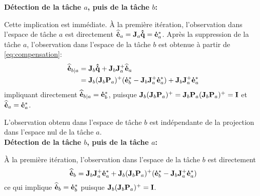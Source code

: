 \noindent\textbf{Détection de la t\^ache $a$, puis de la t\^ache $b$:}

  Cette implication est immédiate.
\`A la première itération, l'observation dans l'espace de t\^ache $a$ est directement
${\mathbf{\widehat{\dot{e}}}}_{a} = {\mathbf{J}}_a{\mathbf{\hat{\dot{q}}}} = {\mathbf{\dot{e}}}_{a}^*$.  
Après la suppression de la t\^ache $a$, l'observation dans l'espace de la t\^ache $b$
est obtenue à partir de \eqref{eq:compensation}:
\begin{align*}
 {\mathbf{\widehat{\dot{e}}}}_{b|a} &=  {\mathbf{J}}_b{\mathbf{\hat{\dot{q}}}} +  {\mathbf{J}}_b {\mathbf{J}}_a^+ {\mathbf{\widehat{\dot{e}}}}_{a}\\
 &= {\mathbf{J}}_b({\mathbf{J}}_b {\mathbf{P}}_a)^+ ({\mathbf{\dot{e}}}_{b}^* - {\mathbf{J}}_b {\mathbf{J}}_a^+{\mathbf{\dot{e}}}_{a}^*) + {\mathbf{J}}_b {\mathbf{J}}_a^+ {\mathbf{\dot{e}}}_{a}^*
\end{align*}
impliquant directement ${\mathbf{\widehat{\dot{e}}}}_{b|a}={\mathbf{\dot{e}}}_{b}^*$, puisque ${\mathbf{J}}_b({\mathbf{J}}_b {\mathbf{P}}_a)^+ = {\mathbf{J}}_b {\mathbf{P}}_a({\mathbf{J}}_b {\mathbf{P}}_a)^+ = {\mathbf{I}}$ et ${\mathbf{\widehat{\dot{e}}}}_{a} = {\mathbf{\dot{e}}}_{a}^*$.

L'observation obtenu dans l'espace de t\^ache $b$ est indépendante de la projection
dans l'espace nul de la t\^ache $a$.\\

\noindent\textbf{Détection de la t\^ache $b$, puis de la t\^ache $a$:}

\`A la première itération, l'observation dans l'espace de la t\^ache $b$ est directement
\begin{equation*}
{\mathbf{\widehat{\dot{e}}}}_{b}  = {\mathbf{J}}_{b} {\mathbf{J}}_{a}^+ {\mathbf{\dot{e}}}_{a}^* + {\mathbf{J}}_{b} ( {\mathbf{J}}_{b} {\mathbf{P}}_{a} )^+ ( {\mathbf{\dot{e}}}_{b}^* - {\mathbf{J}}_{b} {\mathbf{J}}_{a}^+ {\mathbf{\dot{e}}}_{a}^* )
\end{equation*}
ce qui implique ${\mathbf{\widehat{\dot{e}}}}_{b} = {\mathbf{\dot{e}}}_{b}^*$ puisque ${\mathbf{J}}_{b} ( {\mathbf{J}}_{b} {\mathbf{P}}_{a} )^+ = {\mathbf{I}}$.

